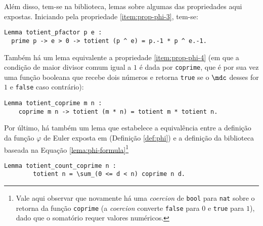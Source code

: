 Além disso, tem-se na biblioteca, lemas sobre algumas das propriedades aqui expostas. Iniciando pela propriedade \ref{item:prop-phi-3}, tem-se:
\begin{lstlisting}[language=coq,frame=single,tabsize=1]
Lemma totient_pfactor p e :
  prime p -> e > 0 -> totient (p ^ e) = p.-1 * p ^ e.-1.
\end{lstlisting}
Também há um lema equivalente a propriedade \ref{item:prop-phi-4} (em que a condição de maior divisor comum igual a $1$ é dada por \lstinline[language = coq]{coprime}, que é por sua vez uma função booleana que recebe dois números e retorna \lstinline[language = coq]{true} se o $\mdc$ desses for $1$ e \lstinline[language = coq]{false} caso contrário):
\begin{lstlisting}[language=coq,frame=single,tabsize=1]
Lemma totient_coprime m n :
    coprime m n -> totient (m * n) = totient m * totient n.
\end{lstlisting}
Por último, há também um lema que estabelece a equivalência entre a definição da função $\varphi$ de Euler exposta em \cite{book:2399854} (Definição \ref{def:phi}) e a definição da biblioteca baseada na Equação \ref{lema:phi-formula}\footnote{Vale aqui observar que novamente há uma \textit{coercion} de \lstinline[language = coq]{bool} para \lstinline[language = coq]{nat} sobre o retorna da função \lstinline[language = coq]{coprime} (a \textit{coercion} converte \lstinline[language = coq]{false} para $0$ e \lstinline[language = coq]{true} para $1$), dado que o somatório requer valores numéricos.}%
\begin{lstlisting}[language=coq,frame=single,tabsize=1]
    Lemma totient_count_coprime n : 
        totient n = \sum_(0 <= d < n) coprime n d.
\end{lstlisting} 

